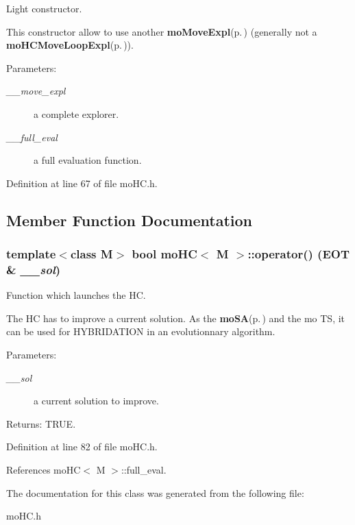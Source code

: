 Light constructor. 

This constructor allow to use another {\bf mo\-Move\-Expl}{\rm (p.\,\pageref{classmo_move_expl})} (generally not a {\bf mo\-HCMove\-Loop\-Expl}{\rm (p.\,\pageref{classmo_h_c_move_loop_expl})}).

\begin{Desc}
\item[Parameters:]
\begin{description}
\item[{\em \_\-\_\-move\_\-expl}]a complete explorer. \item[{\em \_\-\_\-full\_\-eval}]a full evaluation function. \end{description}
\end{Desc}


Definition at line 67 of file mo\-HC.h.

\subsection{Member Function Documentation}
\subsubsection{\setlength{\rightskip}{0pt plus 5cm}template$<$class M$>$ bool {\bf mo\-HC}$<$ M $>$::operator() ({\bf EOT} \& {\em \_\-\_\-sol})\hspace{0.3cm}{\tt  [inline]}}\label{classmo_h_c_ed4e273c420efa6386c5975a696a5010}


Function which launches the HC. 

The HC has to improve a current solution. As the {\bf mo\-SA}{\rm (p.\,\pageref{classmo_s_a})} and the mo TS, it can be used for HYBRIDATION in an evolutionnary algorithm.

\begin{Desc}
\item[Parameters:]
\begin{description}
\item[{\em \_\-\_\-sol}]a current solution to improve. \end{description}
\end{Desc}
\begin{Desc}
\item[Returns:]TRUE. \end{Desc}


Definition at line 82 of file mo\-HC.h.

References mo\-HC$<$ M $>$::full\_\-eval.

The documentation for this class was generated from the following file:\begin{CompactItemize}
\item 
mo\-HC.h\end{CompactItemize}
